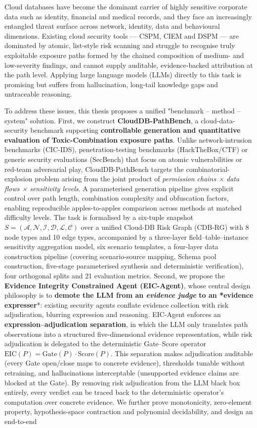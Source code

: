 \documentclass[a4paper,12pt]{ctexart}
\begin{document}
Cloud databases have become the dominant carrier of highly sensitive corporate data such as identity, financial and medical records, and they face an increasingly entangled threat surface across network, identity, data and behavioural dimensions. Existing cloud security tools — CSPM, CIEM and DSPM — are dominated by atomic, list-style risk scanning and struggle to recognise truly exploitable exposure paths formed by the chained composition of medium- and low-severity findings, and cannot supply auditable, evidence-backed attribution at the path level. Applying large language models (LLMs) directly to this task is promising but suffers from hallucination, long-tail knowledge gaps and untraceable reasoning.

To address these issues, this thesis proposes a unified "benchmark – method – system" solution. First, we construct \textbf{CloudDB-PathBench}, a cloud-data-security benchmark supporting \textbf{controllable generation and quantitative evaluation of Toxic-Combination exposure paths}. Unlike network-intrusion benchmarks (CIC-IDS), penetration-testing benchmarks (HackTheBox/CTF) or generic security evaluations (SecBench) that focus on atomic vulnerabilities or red-team adversarial play, CloudDB-PathBench targets the combinatorial-explosion problem arising from the joint product of \textit{permission chains × data flows × sensitivity levels}. A parameterised generation pipeline gives explicit control over path length, combination complexity and obfuscation factors, enabling reproducible apples-to-apples comparison across methods at matched difficulty levels. The task is formalised by a six-tuple snapshot $S=(\mathcal{A},\mathcal{N},\mathcal{I},\mathcal{D},\mathcal{L},\mathcal{C})$ over a unified Cloud-DB Risk Graph (CDB-RG) with 8 node types and 10 edge types, accompanied by a three-layer field–table–instance sensitivity aggregation model, six scenario templates, a four-layer data construction pipeline (covering scenario-source mapping, Schema pool construction, five-stage parameterised synthesis and deterministic verification), four orthogonal splits and 21 evaluation metrics. Second, we propose the \textbf{Evidence Integrity Constrained Agent (EIC-Agent)}, whose central design philosophy is to \textbf{demote the LLM from an \textit{evidence judge} to an *evidence expresser}*: existing security agents conflate evidence collection with risk adjudication, blurring expression and reasoning. EIC-Agent enforces an \textbf{expression–adjudication separation}, in which the LLM only translates path observations into a structured five-dimensional evidence representation, while risk adjudication is delegated to the deterministic Gate–Score operator $\mathrm{EIC}(P)=\mathrm{Gate}(P)\cdot\mathrm{Score}(P)$. This separation makes adjudication auditable (every Gate open/close maps to concrete evidence), thresholds tunable without retraining, and hallucinations interceptable (unsupported evidence claims are blocked at the Gate). By removing risk adjudication from the LLM black box entirely, every verdict can be traced back to the deterministic operator's computation over concrete evidence. We further prove monotonicity, zero-element property, hypothesis-space contraction and polynomial decidability, and design an end-to-end 
\end{document}
